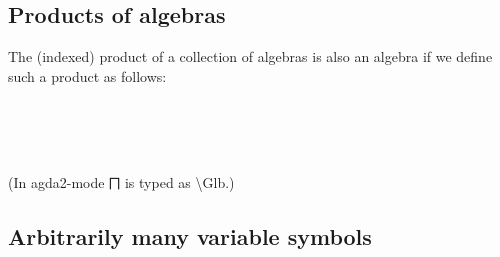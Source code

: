 \documentclass[sigplan,screen]{acmart}
\begin{document}
\subsection{Products of algebras}

The (indexed) product of a collection of algebras is also an algebra if we define such a product as follows:

\begin{code}%
%
\>[1]\AgdaSpace{}%
\AgdaSymbol{:}\AgdaSpace{}%
\AgdaSymbol{\{}\AgdaSpace{}%
\AgdaSymbol{:}\AgdaSpace{}%
\AgdaSpace{}%
\AgdaSpace{}%
\AgdaSymbol{\}(}\AgdaSpace{}%
\AgdaSymbol{:}\AgdaSpace{}%
\AgdaSpace{}%
\AgdaSpace{}%
\AgdaSpace{}%
\AgdaSpace{}%
\AgdaSpace{}%
\AgdaSymbol{)}\AgdaSpace{}%
\AgdaSpace{}%
\AgdaSpace{}%
\AgdaSymbol{(}\AgdaSpace{}%
\AgdaSpace{}%
\AgdaSymbol{)}\AgdaSpace{}%
\<%
\\
%
\>[1]\AgdaSpace{}%
\AgdaSpace{}%
\AgdaSymbol{=}%
\>[8]\AgdaSymbol{((}\AgdaSpace{}%
\AgdaSymbol{:}\AgdaSpace{}%
\AgdaSymbol{\AgdaUnderscore{})}\AgdaSpace{}%
\AgdaSpace{}%
\AgdaSpace{}%
\AgdaSpace{}%
\AgdaSpace{}%
\AgdaSymbol{)}\AgdaSpace{}%
\AgdaOperator{\AgdaInductiveConstructor{,}}%
\>[31]\AgdaSpace{}%
\AgdaSpace{}%
\AgdaSpace{}%
\AgdaSpace{}%
\AgdaSpace{}%
\AgdaSymbol{(}\AgdaSpace{}%
\AgdaSpace{}%
\AgdaSpace{}%
\AgdaSymbol{)}\AgdaSpace{}%
\AgdaSpace{}%
\AgdaSpace{}%
\AgdaSpace{}%
\AgdaSpace{}%
\AgdaSpace{}%
\<%
\\
%
\\[\AgdaEmptyExtraSkip]%
%
\>[1]\AgdaSpace{}%
\AgdaSpace{}%
\<%
\end{code}
(In agda2-mode ⨅ is typed as \textbackslash Glb.)

\subsection{Arbitrarily many variable symbols}
\end{document}
